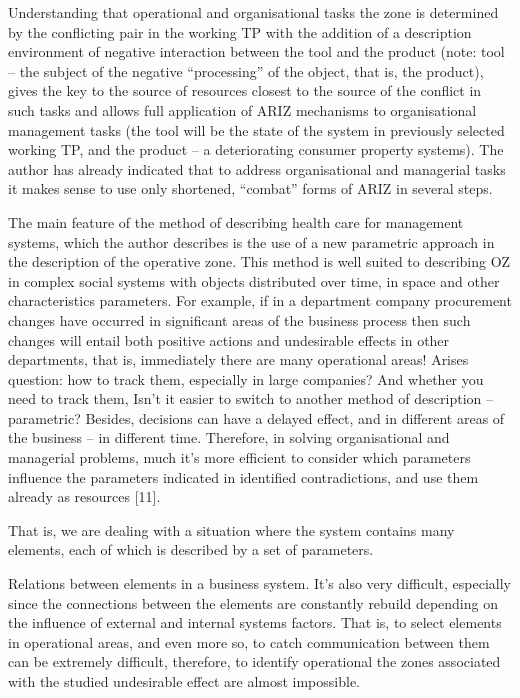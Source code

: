 \documentclass[11pt,a4paper]{book}
\begin{document}
Understanding that operational and organisational tasks the zone is determined
by the conflicting pair in the working TP with the addition of a description
environment of negative interaction between the tool and the product (note:
tool -- the subject of the negative “processing” of the object, that is, the
product), gives the key to the source of resources closest to the source of
the conflict in such tasks and allows full application of ARIZ mechanisms to
organisational management tasks (the tool will be the state of the system in
previously selected working TP, and the product -- a deteriorating consumer
property systems). The author has already indicated that to address
organisational and managerial tasks it makes sense to use only shortened,
“combat” forms of ARIZ in several steps.

The main feature of the method of describing health care for management
systems, which the author describes is the use of a new parametric approach in
the description of the operative zone. This method is well suited to
describing OZ in complex social systems with objects distributed over time, in
space and other characteristics parameters. For example, if in a department
company procurement changes have occurred in significant areas of the business
process then such changes will entail both positive actions and undesirable
effects in other departments, that is, immediately there are many operational
areas! Arises question: how to track them, especially in large companies? And
whether you need to track them, Isn’t it easier to switch to another method of
description -- parametric? Besides, decisions can have a delayed effect, and
in different areas of the business -- in different time. Therefore, in solving
organisational and managerial problems, much it’s more efficient to consider
which parameters influence the parameters indicated in identified
contradictions, and use them already as resources [11].

That is, we are dealing with a situation where the system contains many
elements, each of which is described by a set of parameters.

Relations between elements in a business system.  It’s also very difficult,
especially since the connections between the elements are constantly rebuild
depending on the influence of external and internal systems factors. That is,
to select elements in operational areas, and even more so, to catch
communication between them can be extremely difficult, therefore, to identify
operational the zones associated with the studied undesirable effect are
almost impossible.
\end{document}
